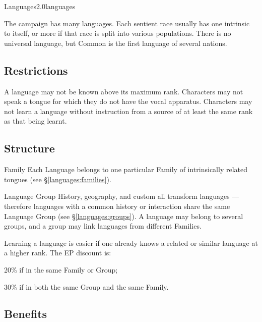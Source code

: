 \begin{skill}{Languages}{2.0}{languages}

The campaign has many languages. Each sentient race usually has one
intrinsic to itself, or more if that race is split into various
populations. There is no universal language, but Common is the first
language of several nations.

\subsection{Restrictions}

A language may not be known above its maximum rank. Characters may not
speak a tongue for which they do not have the vocal apparatus.
Characters may not learn a language without instruction from a source
of at least the same rank as that being learnt.

\subsection{Structure}

\begin{Description}

\item[Family] Each Language belongs to one particular Family of
intrinsically related tongues (see \S\ref{languages:families}).

\item[Language Group] History, geography, and custom all transform
languages --- therefore languages with a common history or interaction
share the same Language Group (see \S\ref{languages:groups}). A
language may belong to several groups, and a group may link languages
from different Families.

\end{Description}

Learning a language is easier if one already knows a related or similar
language at a higher rank. The EP discount is:
\begin{Itemize}

\item 20\% if in the same Family or Group;

\item 30\% if in both the same Group and the same Family. 
\end{Itemize}

\subsection{Benefits}


\end{skill}
